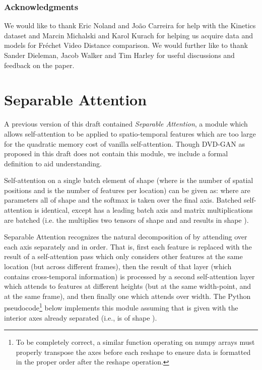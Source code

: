 \documentclass{article} \usepackage{iclr2020_conference,times}
\begin{document}
\subsubsection*{Acknowledgments}

We would like to thank Eric Noland and Jo\~ao Carreira for help with the Kinetics dataset and Marcin Michalski and Karol Kurach for helping us acquire data and models for Fr\'echet Video Distance comparison. We would further like to thank Sander Dieleman, Jacob Walker and Tim Harley for useful discussions and feedback on the paper.

\medskip





\appendix

\section{Separable Attention}

A previous version of this draft contained \textit{Separable Attention}, a module which allows self-attention \citep{vaswani2017attention} to be applied to spatio-temporal features which are too large for the quadratic memory cost of vanilla self-attention. Though DVD-GAN as proposed in this draft does not contain this module, we include a formal definition to aid understanding.

Self-attention on a single batch element  of shape  (where  is the number of spatial positions and  is the number of features per location) can be given as:  where  are parameters all of shape  and the softmax is taken over the final axis. Batched  self-attention is identical, except  has a leading batch axis and matrix multiplications are batched (i.e. the  multiplies two tensors of shape  and  and results in shape ).

Separable Attention recognizes the natural decomposition of  by attending over each axis separately and in order. That is, first each feature is replaced with the result of a self-attention pass which only considers other features at the same  location (but across different frames), then the result of that layer (which contains cross-temporal information) is processed by a second self-attention layer which attends to features at different heights (but at the same width-point, and at the same frame), and then finally one which attends over width. The Python pseudocode\footnote{To be completely correct, a similar function operating on numpy arrays must properly transpose the axes before each reshape to ensure data is formatted in the proper order after the reshape operation.} below implements this module assuming that  is given with the interior axes already separated (i.e.,  is of shape ).
\end{document}
